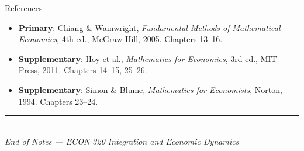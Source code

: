 \documentclass[12pt, a4paper]{article}
\theoremstyle{definition}
\begin{document}
\begin{keybox}{References}
\begin{itemize}
  \item \textbf{Primary}: Chiang \& Wainwright, \textit{Fundamental Methods
        of Mathematical Economics}, 4th ed., McGraw-Hill, 2005.
        Chapters 13--16.
  \item \textbf{Supplementary}: Hoy et al., \textit{Mathematics for
        Economics}, 3rd ed., MIT Press, 2011. Chapters 14--15, 25--26.
  \item \textbf{Supplementary}: Simon \& Blume, \textit{Mathematics for
        Economists}, Norton, 1994. Chapters 23--24.
\end{itemize}
\end{keybox}

\vspace{1cm}
\begin{center}
  \textcolor{slate}{\rule{0.5\linewidth}{0.5pt}}\\[6pt]
  \textcolor{slate}{\small\itshape
    End of Notes --- ECON 320 Integration and Economic Dynamics
  }
\end{center}
\end{document}
